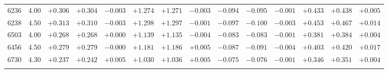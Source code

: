 \documentclass[]{aa}
\begin{document}
\begin{appendix}
\begin{table*}
\begin{center}
\begin{tabular}{llllllllllllll}
6236  &4.00&  $+0.306$ &$ +0.304$ &$ -0.003$ &$ +1.274$ &$ +1.271$ &$ -0.003$ &$ -0.094$ &$ -0.095$ &$ -0.001$ &$ +0.433$ &$ +0.438$  &$+0.005$\\
6238  &4.50&  $+0.313$ &$ +0.310$ &$ -0.003$ &$ +1.298$ &$ +1.297$ &$ -0.001$ &$ -0.097$ &$ -0.100$ &$ -0.003$ &$ +0.453$ &$ +0.467$  &$+0.014$\\
6503  &4.00&  $+0.268$ &$ +0.268$ &$ +0.000$ &$ +1.139$ &$ +1.135$ &$ -0.004$ &$ -0.083$ &$ -0.083$ &$ -0.001$ &$ +0.381$ &$ +0.384$  &$+0.004$\\
6456  &4.50&  $+0.279$ &$ +0.279$ &$ -0.000$ &$ +1.181$ &$ +1.186$ &$ +0.005$ &$ -0.087$ &$ -0.091$ &$ -0.004$ &$ +0.403$ &$ +0.420$  &$+0.017$\\
6730  &4.30&  $+0.237$ &$ +0.242$ &$ +0.005$ &$ +1.030$ &$ +1.036$ &$ +0.005$ &$ -0.075$ &$ -0.076$ &$ -0.001$ &$ +0.346$ &$ +0.351$  &$+0.004$\\
\hline\noalign{\smallskip}
\hline\noalign{\smallskip}
\end{tabular}
\end{center}
\end{table*}




\end{appendix}
\end{document}
